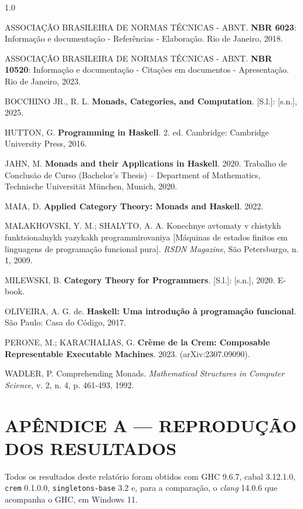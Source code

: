\documentclass[12pt,a4paper]{article}
\begin{document}
\begingroup
\setlength{\parindent}{0pt}
\setlength{\parskip}{0.6em}
\begin{spacing}{1.0}

ASSOCIAÇÃO BRASILEIRA DE NORMAS TÉCNICAS - ABNT. \textbf{NBR 6023}: Informação e documentação - Referências - Elaboração. Rio de Janeiro, 2018.

ASSOCIAÇÃO BRASILEIRA DE NORMAS TÉCNICAS - ABNT. \textbf{NBR 10520}: Informação e documentação - Citações em documentos - Apresentação. Rio de Janeiro, 2023.

BOCCHINO JR., R. L. \textbf{Monads, Categories, and Computation}. [S.l.]: [s.n.], 2025.

HUTTON, G. \textbf{Programming in Haskell}. 2. ed. Cambridge: Cambridge University Press, 2016.

JAHN, M. \textbf{Monads and their Applications in Haskell}. 2020. Trabalho de Conclusão de Curso (Bachelor's Thesis) -- Department of Mathematics, Technische Universität München, Munich, 2020.

MAIA, D. \textbf{Applied Category Theory: Monads and Haskell}. 2022.

MALAKHOVSKI, Y. M.; SHALYTO, A. A. Konechnye avtomaty v chistykh funktsionalnykh yazykakh programmirovaniya [Máquinas de estados finitos em linguagens de programação funcional pura]. \textit{RSDN Magazine}, São Petersburgo, n. 1, 2009.

MILEWSKI, B. \textbf{Category Theory for Programmers}. [S.l.]: [s.n.], 2020. E-book.

OLIVEIRA, A. G. de. \textbf{Haskell: Uma introdução à programação funcional}. São Paulo: Casa do Código, 2017.

PERONE, M.; KARACHALIAS, G. \textbf{Crème de la Crem: Composable Representable Executable Machines}. 2023. (arXiv:2307.09090).

WADLER, P. Comprehending Monads. \textit{Mathematical Structures in Computer Science}, v. 2, n. 4, p. 461-493, 1992.

\end{spacing}
\endgroup


\newpage
\section*{APÊNDICE A --- REPRODUÇÃO DOS RESULTADOS}

Todos os resultados deste relatório foram obtidos com GHC 9.6.7, cabal 3.12.1.0, \texttt{crem} 0.1.0.0, \texttt{singletons-base} 3.2 e, para a comparação, o \textit{clang} 14.0.6 que acompanha o GHC, em Windows 11.
\end{document}
